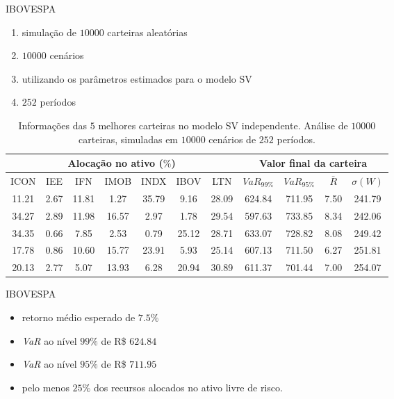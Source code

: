 \documentclass{beamer}
\begin{document}
\begin{frame}{IBOVESPA}



\begin{enumerate}
\item simulação de $10000$ carteiras aleatórias
\item $10000$ cenários
\item utilizando os parâmetros estimados para o modelo SV
\item $252$ períodos
\end{enumerate}


\begin{table}[ht]
\centering
\tiny
\begin{tabular}{ccccccc|cccc}
   \hline
  \hline
 \multicolumn{7}{c|}{Alocação no ativo ($\%$)} &  \multicolumn{4}{c}{Valor final da carteira}\\
 \hline
ICON & IEE & IFN & IMOB & INDX & IBOV & LTN & $VaR_{99\%}$ & $VaR_{95\%}$ & $\bar{R}$  & $\sigma(W)$ \\ 
  \hline
11.21 & 2.67 & 11.81 & 1.27 & 35.79 & 9.16 & 28.09 & 624.84 & 711.95 & 7.50 & 241.79 \\ 
  34.27 & 2.89 & 11.98 & 16.57 & 2.97 & 1.78 & 29.54 & 597.63 & 733.85 & 8.34 & 242.06 \\ 
  34.35 & 0.66 & 7.85 & 2.53 & 0.79 & 25.12 & 28.71 & 633.07 & 728.82 & 8.08 & 249.42 \\ 
  17.78 & 0.86 & 10.60 & 15.77 & 23.91 & 5.93 & 25.14 & 607.13 & 711.50 & 6.27 & 251.81 \\ 
  20.13 & 2.77 & 5.07 & 13.93 & 6.28 & 20.94 & 30.89 & 611.37 & 701.44 & 7.00 & 254.07 \\ 
   \hline
      \hline
\end{tabular}
      \caption{\scriptsize{Informações das $5$ melhores carteiras no modelo SV independente. Análise de $10000$ carteiras, simuladas em $10000$ cenários de $252$ períodos.}}
\label{tab:carteirasim}
\end{table}

\end{frame}


 \begin{frame}{IBOVESPA}


\begin{itemize}
\item retorno médio esperado de $7.5\%$
\item \textit{VaR} ao nível $99\%$  de R\$ $624.84$
\item \textit{VaR} ao nível $95\%$ de R\$ $711.95$
\item pelo menos $25\%$ dos recursos alocados no ativo livre de risco.
\end{itemize}

\end{frame}




\begin{frame}[allowframebreaks]%
    {\tiny
    
    }
\end{frame}
\end{document}
